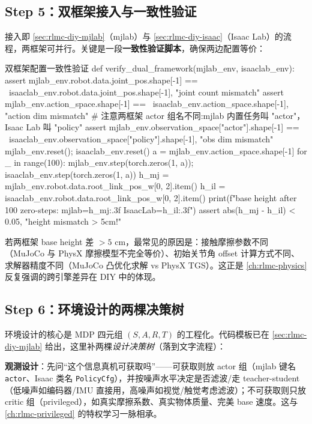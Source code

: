 \subsection{Step 5：双框架接入与一致性验证}
\label{sec:rlmc-diy-pipe-dual}

接入即 \cref{sec:rlmc-diy-mjlab}（mjlab）与 \cref{sec:rlmc-diy-isaac}（Isaac Lab）的流程，两框架可并行。关键是一段\textbf{一致性验证脚本}，确保两边配置等价：

\begin{codebox}[Python]{双框架配置一致性验证}
def verify_dual_framework(mjlab_env, isaaclab_env):
    assert mjlab_env.robot.data.joint_pos.shape[-1] == \
           isaaclab_env.robot.data.joint_pos.shape[-1], "joint count mismatch"
    assert mjlab_env.action_space.shape[-1] == \
           isaaclab_env.action_space.shape[-1], "action dim mismatch"
    # 注意两框架 actor 组名不同:mjlab 内置任务叫 "actor"，Isaac Lab 叫 "policy"
    assert mjlab_env.observation_space["actor"].shape[-1] == \
           isaaclab_env.observation_space["policy"].shape[-1], "obs dim mismatch"
    mjlab_env.reset(); isaaclab_env.reset()
    a = mjlab_env.action_space.shape[-1]
    for _ in range(100):
        mjlab_env.step(torch.zeros(1, a)); isaaclab_env.step(torch.zeros(1, a))
    h_mj = mjlab_env.robot.data.root_link_pos_w[0, 2].item()
    h_il = isaaclab_env.robot.data.root_link_pos_w[0, 2].item()
    print(f"base height after 100 zero-steps: mjlab={h_mj:.3f} IsaacLab={h_il:.3f}")
    assert abs(h_mj - h_il) < 0.05, "height mismatch > 5cm!"
\end{codebox}

若两框架 base height 差 $>5$ cm，最常见的原因是：接触摩擦参数不同（MuJoCo 与 PhysX 摩擦模型不完全等价）、初始关节角 offset 计算方式不同、求解器精度不同（MuJoCo 凸优化求解 vs PhysX TGS）。这正是 \cref{ch:rlmc-physics} 反复强调的跨引擎差异在 DIY 中的体现。

\subsection{Step 6：环境设计的两棵决策树}
\label{sec:rlmc-diy-pipe-design}

环境设计的核心是 MDP 四元组 $(S,A,R,T)$ 的工程化。代码模板已在 \cref{sec:rlmc-diy-mjlab} 给出，这里补两棵\emph{设计决策树}（落到文字流程）：

\textbf{观测设计}：先问“这个信息真机可获取吗”——可获取则放 actor 组（mjlab 键名 \texttt{actor}、Isaac 类名 \texttt{PolicyCfg}），并按噪声水平决定是否滤波/走 teacher-student（低噪声如编码器/IMU 直接用，高噪声如视觉/触觉考虑滤波）；不可获取则只放 critic 组（privileged），如真实摩擦系数、真实物体质量、完美 base 速度。这与 \cref{ch:rlmc-privileged} 的特权学习一脉相承。

